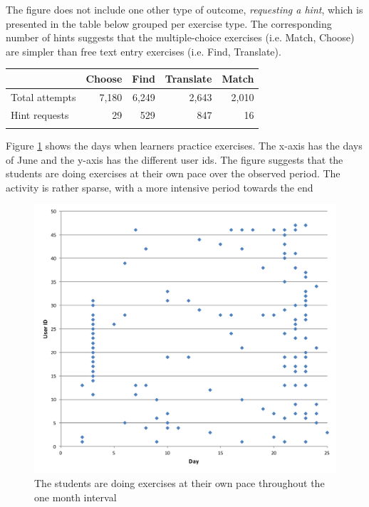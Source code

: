 The figure does not include one other type of outcome, {\em requesting a hint}, which is presented in the table below grouped per exercise type. The corresponding number of hints suggests that the multiple-choice exercises (i.e. Match, Choose) are simpler than free text entry exercises (i.e. Find, Translate).

\begin{tabular}{lrrrr}
                      & Choose  & Find & Translate & Match \\ \hline
  Total attempts  & 7,180    & 6,249 & 2,643      & 2,010\\
  Hint requests       & 29      & 529  & 847       & 16 \\ \hline
  \label{tab:hints_per_ex_type}
\end{tabular}

Figure \ref{fig:activity_per_day} shows the days when learners practice exercises. The x-axis has the days of June and the y-axis has the different user ids. The figure suggests that the students are doing exercises at their own pace over the observed period. The activity is rather sparse, with a more intensive period towards the end 

  \begin{figure}[h!]
  \centering
    \includegraphics[width=0.7\columnwidth]{figures/user_exercise_activity_vs_day.pdf}
    \caption{The students are doing exercises at their own pace throughout the one month interval }
    \label{fig:activity_per_day}
  \end{figure}






